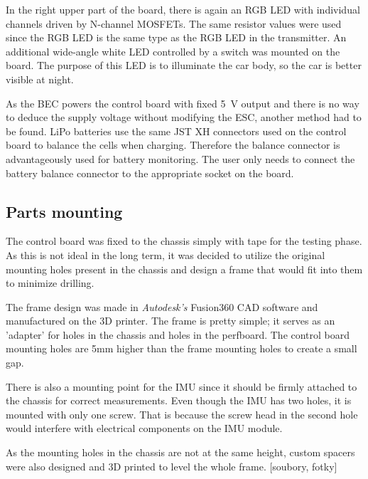 In the right upper part of the board, there is again an RGB LED with individual channels driven by N-channel MOSFETs. The same resistor values were used since the RGB LED is the same type as the RGB LED in the transmitter. An additional wide-angle white LED controlled by a switch was mounted on the board. The purpose of this LED is to illuminate the car body, so the car is better visible at night.

As the BEC powers the control board with fixed \SI{5}{\V} output and there is no way to deduce the supply voltage without modifying the ESC, another method had to be found. LiPo batteries use the same JST XH connectors used on the control board to balance the cells when charging. Therefore the balance connector is advantageously used for battery monitoring. The user only needs to connect the battery balance connector to the appropriate socket on the board.

\subsection{Parts mounting}
The control board was fixed to the chassis simply with tape for the testing phase. As this is not ideal in the long term, it was decided to utilize the original mounting holes present in the chassis and design a frame that would fit into them to minimize drilling.

The frame design was made in \textit{Autodesk's} Fusion360 CAD software and manufactured on the 3D printer. The frame is pretty simple; it serves as an 'adapter' for holes in the chassis and holes in the perfboard. The control board mounting holes are 5mm higher than the frame mounting holes to create a small gap.

There is also a mounting point for the IMU since it should be firmly attached to the chassis for correct measurements. Even though the IMU has two holes, it is mounted with only one screw. That is because the screw head in the second hole would interfere with electrical components on the IMU module.

As the mounting holes in the chassis are not at the same height, custom spacers were also designed and 3D printed to level the whole frame.
[\todo soubory, fotky]
